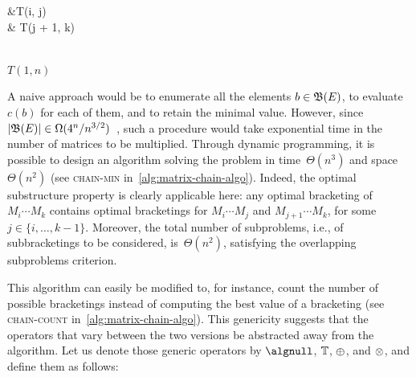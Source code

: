 \begin{algorithm}[h]
{\begin{minipage}[t]{.475\textwidth}
\begin{algorithmic}
                                    \begin{aligned}[t]
                                        &T(i, j) \\[-.75ex]
                                        &\mathbin{\BoxedString{\times}} T(j + 1, k)
                                    \end{aligned}
                            \)
                            \\[2ex]
                        \EndIf
                    \EndFor
                \EndFor
                \vspace{.25ex}
                \State \Return \(T(1, n)\)
            \EndFunction
        \end{algorithmic}
    \end{minipage}
    \par}
    \caption[Compared dynamic programming solutions for matrix chain multiplication]{
        \emph{(Left:)} A dynamic programming solution to the problem of finding the least number of scalar operations needed to compute the product \(E = M_1\cdots M_n\) of matrices of sizes \((x_1, y_1)\) to \((x_n, y_n)\).
        \emph{(Right:)} A simple modification of the algorithm that returns the total number of possible bracketings for \(E\) instead.
        Differences between the two algorithms are highlighted in gray boxes.
        Both algorithms run in time \(\Theta(n^3)\) and space \(\Theta(n^2)\).
        \label{alg:matrix-chain-algo}
    }
\end{algorithm}

A naive approach would be to enumerate all the elements \(b \in \mathfrak{B}(E)\),
to evaluate \(c(b)\) for each of them,
and to retain the minimal value.
However, since \(|\mathfrak{B}(E)| \in \Omega(4^n / n^{3/2})\)~\parencite{Cormen2022IntroductionAlgorithms}, such a procedure would take exponential time in the number of matrices to be multiplied.
Through dynamic programming, it is possible to design an algorithm solving the problem in time~\(\Theta(n^3)\) and space~\(\Theta(n^2)\) (see \textsc{chain-min} in~\cref{alg:matrix-chain-algo}).
Indeed, the optimal substructure property is clearly applicable here: any optimal bracketing of \(M_i\cdots M_k\) contains optimal bracketings for \(M_i\cdots M_j\) and \(M_{j+1}\cdots M_k\), for some \(j \in \{i, \ldots, k-1\}\).
Moreover, the total number of subproblems, i.e., of subbracketings to be considered, is~\(\Theta(n^2)\), satisfying the overlapping subproblems criterion.

This algorithm can easily be modified to, for instance, count the number of possible bracketings instead of computing the best value of a bracketing (see \textsc{chain-count} in~\cref{alg:matrix-chain-algo}).
This genericity suggests that the operators that vary between the two versions be abstracted away from the algorithm.
Let us denote those generic operators by \(\algnull\), \(\mathbb{T}\), \(\mathbin{\oplus}\), and \(\mathbin{\otimes}\), and define them as follows:

